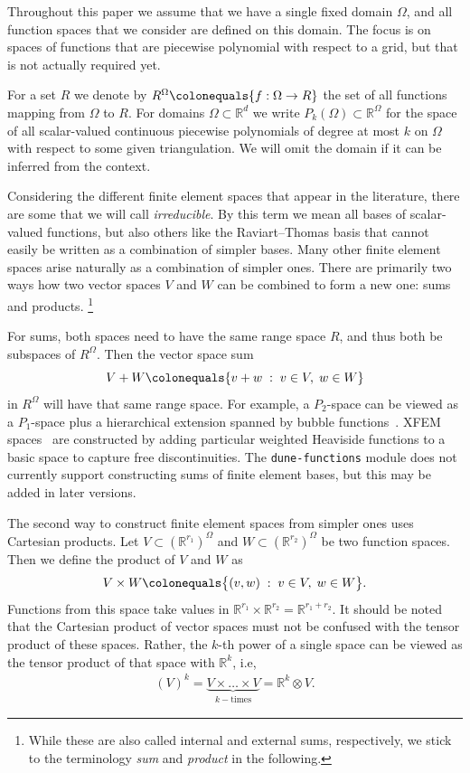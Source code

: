 \documentclass[a4paper,10pt,headings=normal,bibliography=totoc]{scrartcl}
\newcommand{\R}{\mathbb{R}}
\newcommand{\st}{\; : \;}
\newcommand{\dunemodule}[1]{\texttt{#1}}
\begin{document}
Throughout this paper we assume that we have a single fixed domain $\Omega$, and all function spaces
that we consider are defined on this domain.  The focus is on spaces of functions that are
piecewise polynomial with respect to a grid, but that is not actually required yet.

For a set $R$ we denote by $R^\Omega \colonequals \{f:\Omega \to R\}$
the set of all functions mapping from $\Omega$ to $R$. For domains $\Omega\subset \R^d$
we write $P_k(\Omega) \subset \R^\Omega$ for the space of all
scalar-valued continuous piecewise polynomials of degree at most $k$ on $\Omega$
with respect to some given triangulation.
We will omit the domain if it can be inferred from the context.

Considering the different finite element spaces that appear in the literature, there are some that we will
call \emph{irreducible}.  By this term we mean all bases of scalar-valued functions,
but also others like the Raviart--Thomas basis that cannot easily be written as a combination
of simpler bases.
Many other finite element spaces arise naturally as a combination of simpler ones.
There are primarily two ways how two vector spaces $V$ and $W$ can be combined
to form a new one: sums and products.%
%
\footnote{While these are also called
internal and external sums, respectively, we stick to the terminology
\emph{sum} and \emph{product} in the following.
}

For sums, both spaces need to
have the same range space $R$, and thus both be subspaces of $R^\Omega$.
Then the vector space sum
\begin{equation*}
  V + W
  \colonequals
  \{ v + w \; : \; v \in V, \; w \in W \}
\end{equation*}
in $R^\Omega$ will have that same range space.
For example, a $P_2$-space
can be viewed as a $P_1$-space plus a hierarchical extension spanned by bubble functions~\cite{bank:1996}.
XFEM spaces~\cite{moes_dolbow_belytschko:1999} are constructed by adding particular weighted Heaviside
functions to a basic space to capture free discontinuities.
The \dunemodule{dune-functions} module does not currently support constructing sums
of finite element bases, but this may be added in later versions.

The second way to construct finite element spaces from simpler ones uses Cartesian products.
Let $V \subset (\R^{r_1})^\Omega$ and $W \subset (\R^{r_2})^\Omega$ be two function spaces.
Then we define the product of $V$ and $W$ as
\begin{align*}
  V \times W
    \colonequals \big\{ (v,w) \st v \in V, \; w \in W \big\}.
\end{align*}
Functions from this space take values in $\R^{r_1} \times \R^{r_2} = \R^{r_1 + r_2}$.
It should be noted that the Cartesian product of
vector spaces must not be confused with the tensor product of these spaces.
Rather, the $k$-th power
of a single space can be viewed as the tensor product of that space with $\R^k$, i.e,
\begin{align*}
    (V)^k
    = \underbrace{V \times \dots \times V}_{k-\text{times}}
    = \R^k \otimes V.
\end{align*}
\end{document}
